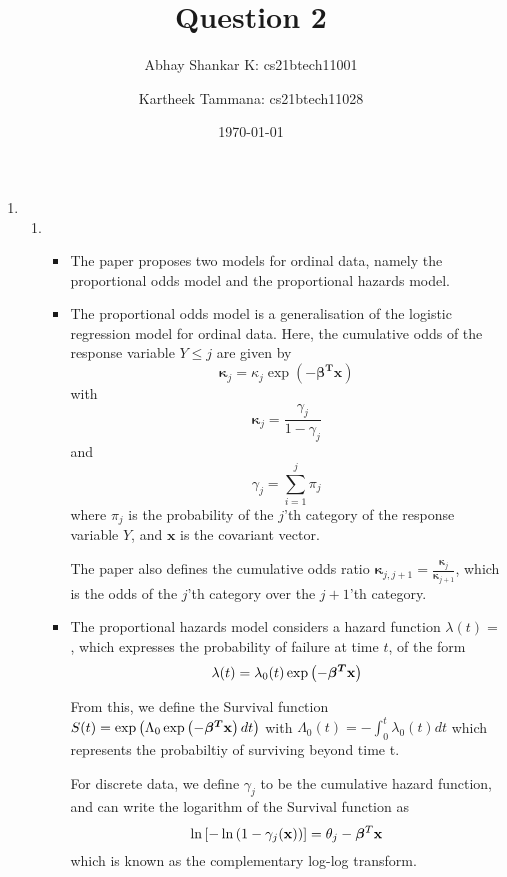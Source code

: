 \documentclass[reqno]{amsart}
\begin{document}
    \title{Question 2}
    \author{Abhay Shankar K: cs21btech11001}
    \author{Kartheek Tammana: cs21btech11028}
    \date{\today}
    
    \maketitle

    \begin{enumerate}[label=\textbf{(\Roman*)}]
        \item \begin{enumerate}[label=\textbf{(\alph*)}]
            \item \begin{itemize}
                \item The paper proposes two models for ordinal data, namely the proportional odds model and the proportional hazards model.
                \item The proportional odds model is a generalisation of the logistic regression model for ordinal data. Here, the cumulative odds of the response variable \(Y \leq j\) are given by 
                \[\boldsymbol{\kappa}_j = \kappa_j \exp (- \boldsymbol{\beta^T} \mathbf{x})\]
                with 
                \[\boldsymbol{\kappa}_j = \frac{\gamma_j}{1 - \gamma_j}\]
                and
                \[\gamma_j = \sum_{i = 1}^{j} \pi_j\]
                where \(\pi_j\) is the probability of the \(j\)'th category of the response variable \(Y\), and \(\mathbf{x}\) is the covariant vector.
                
                The paper also defines the cumulative odds ratio \(\boldsymbol{\kappa}_{j, j + 1} = \frac{\boldsymbol{\kappa}_j}{\boldsymbol{\kappa}_{j + 1}}\), which is the odds of the \(j\)'th category over the \(j + 1\)'th category.

                \item The proportional hazards model considers a hazard function \(\lambda(t) = \), which expresses the probability of failure at time \(t\), of the form \[\lambda(t) = \lambda_0(t) \exp \left(- \boldsymbol{\beta^T} \mathbf{x}\right)\]
                
                From this, we define the Survival function \(S(t) = \exp \left(\Lambda_0 \exp \left(- \boldsymbol{\beta^T} \mathbf{x}\right) dt\right)\) with \(\Lambda_0(t) = - \int_{0}^{t} \lambda_0(t) dt \) which represents the probabiltiy of surviving beyond time t.

                For discrete data, we define \(\gamma_j\) to be the cumulative hazard function, and can write the logarithm of the Survival function as \[\ln \left[- \ln \left(1 - \gamma_j(\mathbf{x})\right)\right] = \theta_j - \boldsymbol{\beta}^T \mathbf{x}\] which is known as the complementary log-log transform.



\end{itemize}
\end{enumerate}
\end{enumerate}
\end{document}
